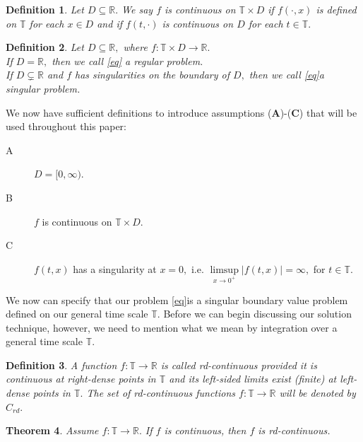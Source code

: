 \documentclass[12pt,reqno]{amsart}
\newtheorem{theorem}{Theorem}[section]
\newtheorem{definition}[theorem]{Definition}
\begin{document}
\begin{definition}
	Let $D \subseteq \mathbb{R}.$  We say $f$ is continuous on $\mathbb{T} \times D$ if $f(\cdot, x)$ is defined on $\mathbb{T}$ for each $x \in D$ and if $f(t, \cdot)$ is continuous on $D$ for each $t \in \mathbb{T}.$
\end{definition}

\begin{definition}
	Let $D \subseteq \mathbb{R},$ where $f:\mathbb{T} \times D \rightarrow \mathbb{R}.$ \\ If $D = \mathbb{R},$ then we call \eqref{eq} a regular problem. \\ If $D \subsetneq \mathbb{R}$ and $f$ has singularities on the boundary of $D,$ then we call \eqref{eq}a singular problem.
\end{definition}

We now have sufficient definitions to introduce assumptions (\textbf{A})-(\textbf{C}) that will be used throughout this paper:

\begin{description}
	\item[A] {$D = [0, \infty).$}
	\item[B] {$f$ is continuous on $\mathbb{T} \times D.$}
	\item[C] {$f(t, x)$ has a singularity at $x=0,$ i.e. $\limsup\limits_{x \rightarrow 0^{+}} |f(t, x)| = \infty,$ for $t \in \mathbb{T}.$}
\end{description}

We now can specify that our problem \eqref{eq}is a singular boundary value problem defined on our general time scale $\mathbb{T}.$  Before we can begin discussing our solution technique, however, we need to mention what we mean by integration over a general time scale $\mathbb{T}.$  

\begin{definition}
	A function $f:\mathbb{T} \rightarrow \mathbb{R}$ is called rd-continuous provided it is continuous at right-dense points in $\mathbb{T}$ and its left-sided limits exist (finite) at left-dense points in $\mathbb{T}.$  The set of rd-continuous functions $f:\mathbb{T} \rightarrow \mathbb{R}$ will be denoted by $C_{rd}.$
\end{definition}

\begin{theorem}
	Assume $f:\mathbb{T} \rightarrow \mathbb{R}.$  If $f$ is continuous, then $f$ is rd-continuous.
\end{theorem}
\end{document}
